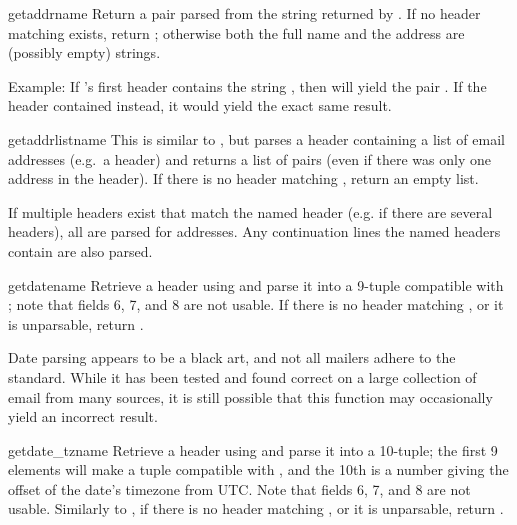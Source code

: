 \begin{methoddesc}{getaddr}{name}
Return a pair  parsed
from the string returned by .  If no
header matching  exists, return ;
otherwise both the full name and the address are (possibly empty)
strings.

Example: If 's first  header contains the
string , then
 will yield the pair
.
If the header contained
 instead, it would yield the
exact same result.
\end{methoddesc}

\begin{methoddesc}{getaddrlist}{name}
This is similar to , but parses a header
containing a list of email addresses (e.g.\ a  header) and
returns a list of  pairs
(even if there was only one address in the header).  If there is no
header matching , return an empty list.

If multiple headers exist that match the named header (e.g. if there
are several  headers), all are parsed for addresses.
Any continuation lines the named headers contain are also parsed.
\end{methoddesc}

\begin{methoddesc}{getdate}{name}
Retrieve a header using  and parse it into a 9-tuple
compatible with ; note that fields 6, 7, and 8 
are not usable.  If there is no header matching
, or it is unparsable, return .

Date parsing appears to be a black art, and not all mailers adhere to
the standard.  While it has been tested and found correct on a large
collection of email from many sources, it is still possible that this
function may occasionally yield an incorrect result.
\end{methoddesc}

\begin{methoddesc}{getdate_tz}{name}
Retrieve a header using  and parse it into a
10-tuple; the first 9 elements will make a tuple compatible with
, and the 10th is a number giving the offset
of the date's timezone from UTC.  Note that fields 6, 7, and 8 
are not usable.  Similarly to , if
there is no header matching , or it is unparsable, return
. 
\end{methoddesc}

